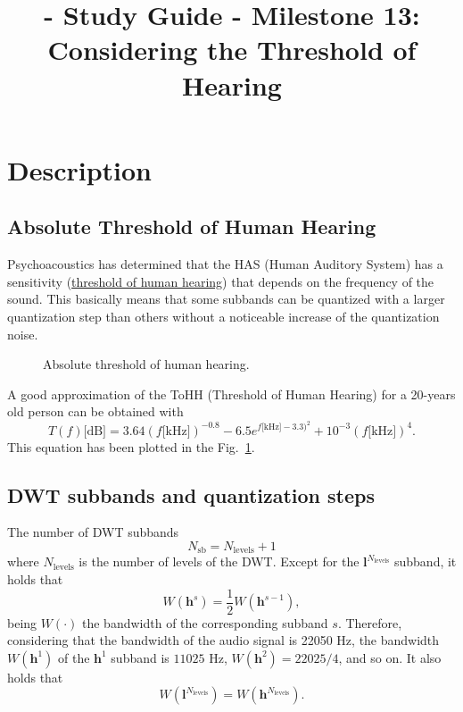 
\title{\TM{} - Study Guide - Milestone 13: Considering the Threshold of Hearing}

\maketitle

\section{Description}

\subsection{Absolute Threshold of Human Hearing}
Psychoacoustics has determined that the HAS (Human Auditory System) has a
sensitivity
(\href{https://en.wikipedia.org/wiki/Absolute_threshold_of_hearing}{threshold
  of human hearing}) that depends on the frequency of the sound. This
basically means that some subbands can be quantized with a larger
quantization step than others without a noticeable increase of the
quantization noise.

\begin{figure}
  \centering
  \caption{Absolute threshold of human hearing.}
  \label{fig:ToHH}
\end{figure}

A good approximation of the ToHH (Threshold of Human Hearing) for a 20-years old person can be
obtained with~\cite{bosi2003intro}
\begin{equation}
  T(f)\text{[dB]} = 3.64(f\text{[kHz]})^{-0.8} - 6.5e^{f\text{[kHz]}-3.3)^2} + 10^{-3}(f\text{[kHz]})^4.
  \label{eq:ToHH}
\end{equation}
This equation has been plotted in the Fig.~\ref{fig:ToHH}.

\subsection{DWT subbands and quantization steps}
The number of DWT subbands
\begin{equation}
  N_{\text{sb}} = N_{\text{levels}} + 1
\end{equation}
where $N_{\text{levels}}$ is the number of levels of the DWT. Except for
the ${\mathbf l}^{N_{\text{levels}}}$ subband, it holds that
\begin{equation}
  W({\mathbf h}^s) = \frac{1}{2}W({\mathbf h}^{s-1}),
\end{equation}
being $W(\cdot)$ the bandwidth of the corresponding
subband $s$. Therefore, considering that the bandwidth of the audio signal
is 22050 Hz, the bandwidth $W({\mathbf h}^1)$ of the ${\mathbf h}^1$ subband is $11025$ Hz,
$W({\mathbf h} ^2)=22025/4$, and so on. It also holds that
\begin{equation}
  W({\mathbf l}^{N_{\text{levels}}}) = W({\mathbf h}^{N_{\text{levels}}}).
\end{equation}

